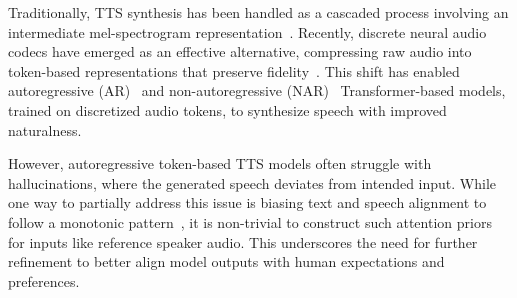 Traditionally, TTS synthesis has been handled as a cascaded process involving an intermediate mel-spectrogram representation~\cite{tacotron,lancucki2021fastpitch,onealign,neekhara2021expressive,hussain2023ace}.
Recently, discrete neural audio codecs have emerged as an effective alternative, compressing raw audio into token-based representations that preserve fidelity~\cite{encodec,dac_kumar2024high,zeghidour2021soundstream,langman2024spectral,casanova2024low}. 
This shift has enabled autoregressive (AR)~\cite{wang2023neural,zhang2023speak,chen2024vall,borsos2023audiolm,yanguniaudio,wang2024speechx} and non-autoregressive (NAR)~\cite{langman2024spectral} Transformer-based models, trained on discretized audio tokens, to synthesize speech with improved naturalness. 


However, autoregressive token-based TTS models often struggle with hallucinations, where the generated speech deviates from intended input. 
While one way to partially address this issue is biasing text and speech alignment to follow a monotonic pattern~\cite{t5tts,kim2020glow}, 
it is non-trivial to construct such attention priors for inputs like reference speaker audio. 
This underscores the need for further refinement to better align model outputs with human expectations and preferences.

